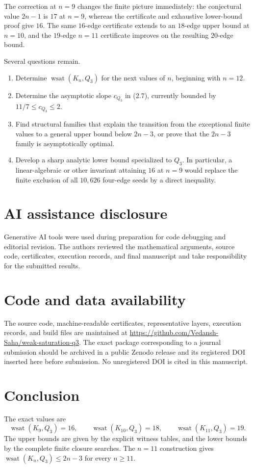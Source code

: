 \documentclass[11pt]{article}
\numberwithin{equation}{section}
\newcommand{\wsat}{\operatorname{wsat}}
\begin{document}
The correction at $n=9$ changes the finite picture immediately: the conjectural value $2n-1$ is $17$ at $n=9$, whereas the certificate and exhaustive lower-bound proof give $16$. The same $16$-edge certificate extends to an $18$-edge upper bound at $n=10$, and the $19$-edge $n=11$ certificate improves on the resulting $20$-edge bound.

Several questions remain.

\begin{enumerate}[leftmargin=2em]
\item Determine $\wsat(K_n,Q_3)$ for the next values of $n$, beginning with $n=12$.
\item Determine the asymptotic slope $c_{Q_3}$ in (2.7), currently bounded by $11/7\le c_{Q_3}\le2$.
\item Find structural families that explain the transition from the exceptional finite values to a general upper bound below $2n-3$, or prove that the $2n-3$ family is asymptotically optimal.
\item Develop a sharp analytic lower bound specialized to $Q_3$. In particular, a linear-algebraic or other invariant attaining $16$ at $n=9$ would replace the finite exclusion of all $10,626$ four-edge seeds by a direct inequality.
\end{enumerate}

\section*{AI assistance disclosure}
Generative AI tools were used during preparation for code debugging and editorial revision. The authors reviewed the
mathematical arguments, source code, certificates, execution records, and
final manuscript and take responsibility for the submitted results.

\section*{Code and data availability}
The source code, machine-readable certificates, representative layers,
execution records, and build files are maintained at
\url{https://github.com/Vedansh-Saha/weak-saturation-q3}. The exact package
corresponding to a journal submission should be archived in a public Zenodo
release and its registered DOI inserted here before submission. No unregistered
DOI is cited in this manuscript.

\section{Conclusion}
The exact values are
\[
\boxed{\wsat(K_9,Q_3)=16,\qquad
\wsat(K_{10},Q_3)=18,\qquad
\wsat(K_{11},Q_3)=19.}
\]
The upper bounds are given by the explicit witness tables, and the lower
bounds by the complete finite closure searches. The $n=11$ construction gives
$\wsat(K_n,Q_3)\le2n-3$ for every $n\ge11$.
\end{document}
